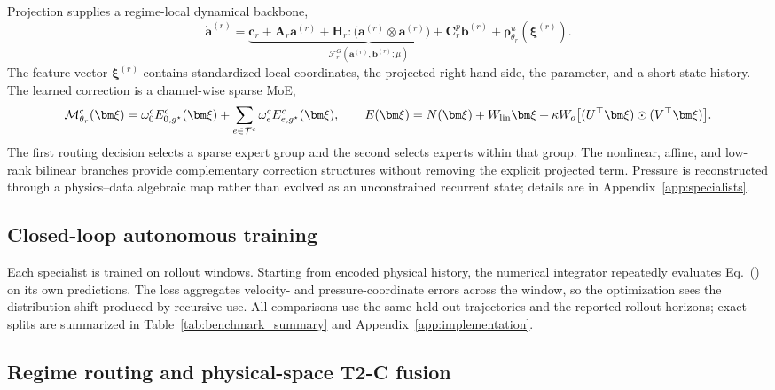 Projection supplies a regime-local dynamical backbone,
\begin{equation}
  \dot{\bm a}^{(r)}=
  \underbrace{\bm c_r+\bm A_r\bm a^{(r)}+
  \bm H_r:\bigl(\bm a^{(r)}\otimes\bm a^{(r)}\bigr)+
  \bm C^p_r\bm b^{(r)}}_{\mathcal F_r^{G}(\bm a^{(r)},\bm b^{(r)};\mu)}
  +\bm\rho^u_{\theta_r}(\bm\xi^{(r)}).
  \label{eq:main_specialist}
\end{equation}
The feature vector $\bm\xi^{(r)}$ contains standardized local coordinates, the projected right-hand side, the parameter, and a short state history. The learned correction is a channel-wise sparse MoE,
\begin{equation}
  \mathcal M^c_{\theta_r}(\bm\xi)=
  \omega^c_0 E^c_{0,g^\star}(\bm\xi)+
  \sum_{e\in\mathcal T^c}\omega^c_e E^c_{e,g^\star}(\bm\xi),
  \qquad
  E(\bm\xi)=N(\bm\xi)+W_{\rm lin}\bm\xi+
  \kappa W_o\bigl[(U^\top\bm\xi)\odot(V^\top\bm\xi)\bigr].
  \label{eq:main_inner_moe}
\end{equation}
The first routing decision selects a sparse expert group and the second selects experts within that group. The nonlinear, affine, and low-rank bilinear branches provide complementary correction structures without removing the explicit projected term. Pressure is reconstructed through a physics--data algebraic map rather than evolved as an unconstrained recurrent state; details are in Appendix~\ref{app:specialists}.

\subsection{Closed-loop autonomous training}

Each specialist is trained on rollout windows. Starting from encoded physical history, the numerical integrator repeatedly evaluates Eq.~() on its own predictions. The loss aggregates velocity- and pressure-coordinate errors across the window, so the optimization sees the distribution shift produced by recursive use. All comparisons use the same held-out trajectories and the reported rollout horizons; exact splits are summarized in Table~\ref{tab:benchmark_summary} and Appendix~\ref{app:implementation}.

\subsection{Regime routing and physical-space T2-C fusion}

